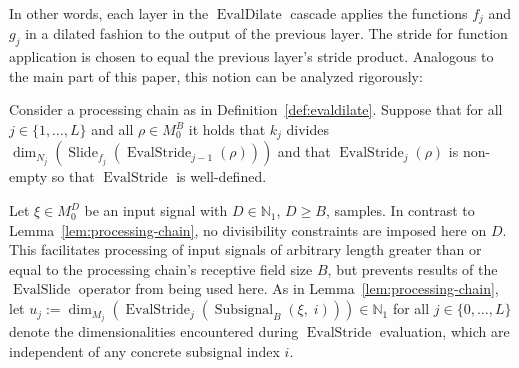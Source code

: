 \documentclass[journal]{IEEEtran}
\newcommand{\N}{\mathbb{N}}
\newcommand{\ROI}{B}
\newcommand{\discint}[2]{\{#1,\dotsc,#2\}}
\newcommand{\inint}[2]{\in\discint{#1}{#2}}
\DeclareMathOperator{\Subsignal}{Subsignal}
\DeclareMathOperator{\Slide}{Slide}
\DeclareMathOperator{\EvalStride}{EvalStride}
\DeclareMathOperator{\EvalSlide}{EvalSlide}
\DeclareMathOperator{\EvalDilate}{EvalDilate}
\begin{document}
In other words, each layer in the $\EvalDilate$ cascade applies the functions $f_j$ and $g_j$ in a dilated fashion to the output of the previous layer.
The stride for function application is chosen to equal the previous layer's stride product.
Analogous to the main part of this paper, this notion can be analyzed rigorously:
\begin{lemma}
\label{lem:evaldilate}
Consider a processing chain as in Definition~\ref{def:evaldilate}.
Suppose that for all $j\inint{1}{L}$ and all $\rho\in M_0^\ROI$ it holds that $k_j$ divides $\dim_{N_j}(\Slide_{f_j}(\EvalStride_{j - 1}(\rho)))$ and that $\EvalStride_{j}(\rho)$ is non-empty so that $\EvalStride$ is well-defined.

Let $\xi\in M_0^D$ be an input signal with $D\in\N_1$, $D\geq\ROI$, samples.
In contrast to Lemma~\ref{lem:processing-chain}, no divisibility constraints are imposed here on $D$.
This facilitates processing of input signals of arbitrary length greater than or equal to the processing chain's receptive field size $\ROI$, but prevents results of the $\EvalSlide$ operator from being used here.
As in Lemma~\ref{lem:processing-chain}, let $u_j := \dim_{M_j}(\EvalStride_j(\Subsignal_\ROI(\xi,\; i)))\in\N_1$ for all $j\inint{0}{L}$ denote the dimensionalities encountered during $\EvalStride$ evaluation, which are independent of any concrete subsignal index $i$.


\end{lemma}
\end{document}
